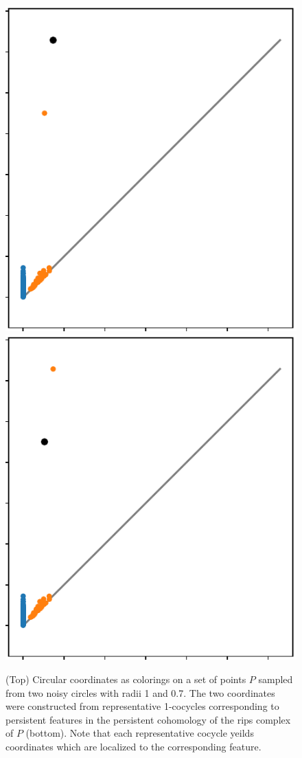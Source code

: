 \begin{figure}[htbp]
  \includegraphics[scale=0.5]{figures/circular_dgm1.pdf}\hspace{1.3in}
  \includegraphics[scale=0.5]{figures/circular_dgm2.pdf}
   \caption{(Top) Circular coordinates as colorings on a set of points $P$ sampled from two noisy circles with radii 1 and 0.7.
        The two coordinates were constructed from representative 1-cocycles corresponding to persistent features in the persistent cohomology of the rips complex of $P$ (bottom).
        Note that each representative cocycle yeilds coordinates which are localized to the corresponding feature.}
   \label{fig:circular}
\end{figure}

